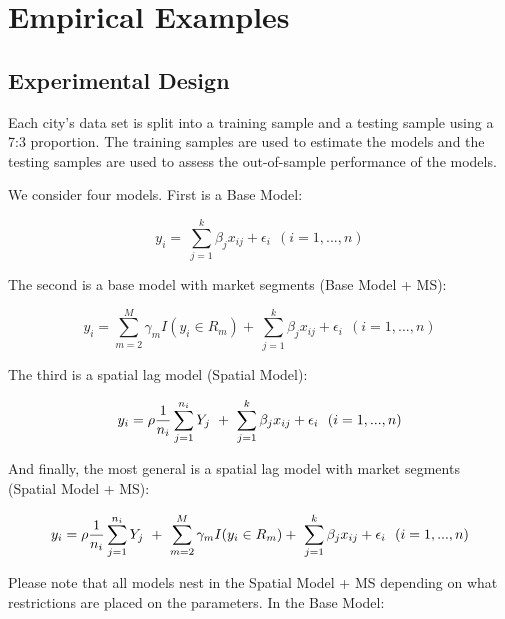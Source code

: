 \documentclass[Royal,times,sageh]{sagej}
\begin{document}
\hypertarget{empirical-examples}{%
\section{Empirical Examples}\label{empirical-examples}}

\hypertarget{experimental-design}{%
\subsection{Experimental Design}\label{experimental-design}}

Each city's data set is split into a training sample and a testing
sample using a 7:3 proportion. The training samples are used to estimate
the models and the testing samples are used to assess the out-of-sample
performance of the models.

We consider four models. First is a Base Model:

\begin{equation}
y_i = \ \sum_{j=1}^{k}{\beta_{j} x_{ij}} + \epsilon_i \ \ (i=1,...,n)
\label{eq:base-model}
\end{equation}

The second is a base model with market segments (Base Model + MS):

\begin{equation}
y_i = \sum_{m=2}^{M}{\gamma_{m} I(y_i\in R_m)} + \ \sum_{j=1}^{k}{\beta_{j} x_{ij}} + \epsilon_i \ \ (i=1,...,n)
\label{eq:base-model-ms}
\end{equation}

The third is a spatial lag model (Spatial Model):

\begin{equation}
y_i = \rho {1 \over n_i } \sum_{j=1}^{n_i}{Y_j} \ + \ \sum_{j=1}^{k}{\beta_{j} x_{ij}} + \epsilon_i \ \ (i=1,...,n)
\label{eq:spatial-model}
\end{equation}

And finally, the most general is a spatial lag model with market
segments (Spatial Model + MS):

\begin{equation}
y_i = \rho {1 \over n_i } \sum_{j=1}^{n_i}{Y_j} \ + \ \sum_{m=2}^{M}{\gamma_{m} I(y_i\in R_m)} + \ \sum_{j=1}^{k}{\beta_{j} x_{ij}} + \epsilon_i \ \ (i=1,...,n)
\label{eq:spatial-model-ms}
\end{equation}

Please note that all models nest in the Spatial Model + MS depending on
what restrictions are placed on the parameters. In the Base Model:
\end{document}
